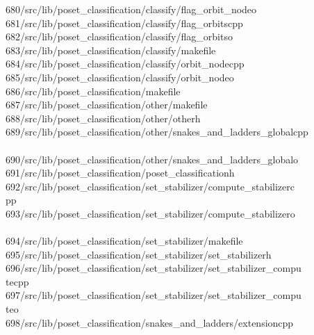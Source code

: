 \begin{tabbing}
680\>/src/lib/poset\_classification/classify/flag\_orbit\_nodeo\\[0pt]
681\>/src/lib/poset\_classification/classify/flag\_orbitscpp\\[0pt]
682\>/src/lib/poset\_classification/classify/flag\_orbitso\\[0pt]
683\>/src/lib/poset\_classification/classify/makefile\\[0pt]
684\>/src/lib/poset\_classification/classify/orbit\_nodecpp\\[0pt]
685\>/src/lib/poset\_classification/classify/orbit\_nodeo\\[0pt]
686\>/src/lib/poset\_classification/makefile\\[0pt]
687\>/src/lib/poset\_classification/other/makefile\\[0pt]
688\>/src/lib/poset\_classification/other/otherh\\[0pt]
689\>/src/lib/poset\_classification/other/snakes\_and\_ladders\_globalcpp\\[0pt]
\>\\[0pt]
690\>/src/lib/poset\_classification/other/snakes\_and\_ladders\_globalo\\[0pt]
691\>/src/lib/poset\_classification/poset\_classificationh\\[0pt]
692\>/src/lib/poset\_classification/set\_stabilizer/compute\_stabilizerc\\[0pt]
\>pp\\[0pt]
693\>/src/lib/poset\_classification/set\_stabilizer/compute\_stabilizero\\[0pt]
\>\\[0pt]
694\>/src/lib/poset\_classification/set\_stabilizer/makefile\\[0pt]
695\>/src/lib/poset\_classification/set\_stabilizer/set\_stabilizerh\\[0pt]
696\>/src/lib/poset\_classification/set\_stabilizer/set\_stabilizer\_compu\\[0pt]
\>tecpp\\[0pt]
697\>/src/lib/poset\_classification/set\_stabilizer/set\_stabilizer\_compu\\[0pt]
\>teo\\[0pt]
698\>/src/lib/poset\_classification/snakes\_and\_ladders/extensioncpp\\[0pt]

\end{tabbing}
